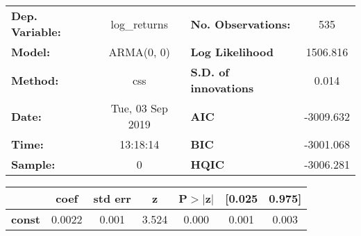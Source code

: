 \begin{center}
\begin{tabular}{lclc}
\toprule
\textbf{Dep. Variable:} &   log\_returns   & \textbf{  No. Observations:  } &    535      \\
\textbf{Model:}         &    ARMA(0, 0)    & \textbf{  Log Likelihood     } &  1506.816   \\
\textbf{Method:}        &       css        & \textbf{  S.D. of innovations} &   0.014     \\
\textbf{Date:}          & Tue, 03 Sep 2019 & \textbf{  AIC                } & -3009.632   \\
\textbf{Time:}          &     13:18:14     & \textbf{  BIC                } & -3001.068   \\
\textbf{Sample:}        &        0         & \textbf{  HQIC               } & -3006.281   \\
\bottomrule
\end{tabular}
\begin{tabular}{lcccccc}
               & \textbf{coef} & \textbf{std err} & \textbf{z} & \textbf{P$> |$z$|$} & \textbf{[0.025} & \textbf{0.975]}  \\
\midrule
\textbf{const} &       0.0022  &        0.001     &     3.524  &         0.000        &        0.001    &        0.003     \\
\bottomrule
\end{tabular}
\end{center}
